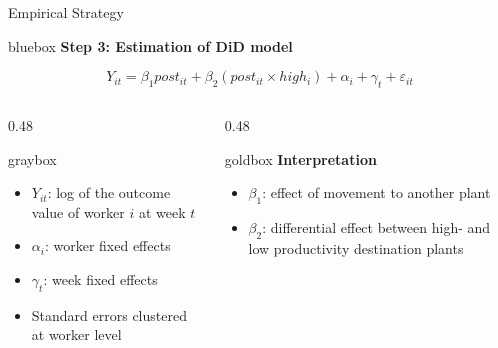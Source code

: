 \documentclass[aspectratio=169]{beamer}
\newcommand{\softbox}[2]{%
\begin{beamercolorbox}[rounded=true,shadow=false,wd=\linewidth,sep=0.18cm]{#1}
#2
\end{beamercolorbox}}
\begin{document}
\begin{frame}{Empirical Strategy}

\softbox{bluebox}{%
\textbf{Step 3: Estimation of DiD model}

\[
Y_{it} = \beta_1 post_{it} + \beta_2 (post_{it} \times high_i) + \alpha_i + \gamma_t + \varepsilon_{it}
\]
}

\vspace{0.35cm}

\begin{columns}[T,onlytextwidth]
\begin{column}{0.48\textwidth}
\softbox{graybox}{%
\begin{itemize}
\item $Y_{it}$: log of the outcome value of worker $i$ at week $t$
    \item $\alpha_i$: worker fixed effects
    \item $\gamma_t$: week fixed effects
    \item Standard errors clustered at worker level %
\end{itemize}
}
\end{column}
\begin{column}{0.48\textwidth}
\softbox{goldbox}{%
\textbf{Interpretation}
\begin{itemize}
    \item $\beta_1$: effect of movement to another plant
    \item $\beta_2$: differential effect between high- and low productivity destination plants
\end{itemize}
}
\end{column}
\end{columns}
\end{frame}
\end{document}
